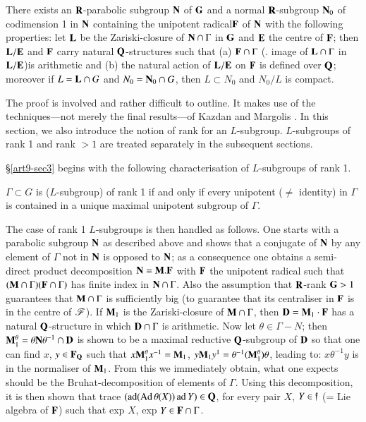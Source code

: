 There exists an $\mathbf{R}$-parabolic subgroup $\mathbf{N}$ of $\mathbf{G}$ and a normal $\mathbf{R}$-subgroup $\mathbf{N}_0$ of codimension  1 in $\mathbf{N}$ containing the unipotent radical\pageoriginale  $\mathbf{F}$ of $\mathbf{N}$ with the following properties: let $\mathbf{L}$ be the Zariski-closure of $\mathbf{N} \cap \Gamma$  in $\mathbf{G}$ and $\mathbf{E}$ the centre of $\mathbf{F}$; then $\mathbf{L}/\mathbf{E}$ and $\mathbf{F}$ carry natural $\mathbf{Q}$-structures such that (a) $\mathbf{F} \cap \Gamma$ (\resp. image of $\mathbf{L}\cap \Gamma$ in $\mathbf{L}/ \mathbf{E}$)is arithmetic and (b) the natural action of $\mathbf{L}/\mathbf{E}$ on $\mathbf{F}$ is defined over $\mathbf{Q}$; moreover if $L = \mathbf{L} \cap G$ and $N_0 = \mathbf{N}_0 \cap G$, then $L \subset N_0$ and $N_0/ L$ is compact.

The proof is involved and rather difficult to outline. It makes use of the techniques---not merely the final results---of Kazdan and Margolis \cite{art9-kazdan-margolis-1}. In this section, we also introduce the notion of rank for an $L$-subgroup. $L$-subgroups of rank 1 and rank $> 1$ are treated separately in the subsequent sections.

\S\ref{art9-sec3} begins with the following characterisation of $L$-subgroups of rank 1. 

$\Gamma \subset G$ is ($L$-subgroup) of rank 1 if and only if every unipotent ($\neq$ identity) in $\Gamma$ is contained in a unique maximal unipotent subgroup of $\Gamma$.

The case of rank 1 $L$-subgroups is then handled as follows. One starts with a parabolic subgroup $\mathbf{N}$ as described above and shows that a conjugate of $\mathbf{N}$ by any element of $\Gamma$ not in $\mathbf{N}$ is opposed to $\mathbf{N}$; as a consequence one obtains a semi-direct product decomposition $\mathbf{N} = \mathbf{M}. \mathbf{F}$ with $\mathbf{F}$ the unipotent radical such that $(\mathbf{M} \cap \Gamma) (\mathbf{F} \cap \Gamma)$  has finite index in $\mathbf{N} \cap \Gamma$. Also the assumption that $\mathbf{R}$-rank $\mathbf{G}>1$ guarantees that $\mathbf{M} \cap \Gamma$ is sufficiently big (to guarantee that its centraliser in $\mathbf{F}$ is in the centre of $\mathscr{F}$). If $\mathbf{M}_1$ is the Zariski-closure of $\mathbf{M} \cap \Gamma$, then $\mathbf{D} = \mathbf{M}_1 \cdot \mathbf{F}$ has a natural $\mathbf{Q}$-structure in which $\mathbf{D} \cap \Gamma$ is arithmetic. Now let $\theta \in \Gamma -N$; then $\mathbf{M}^\theta_1 = \theta \mathbf{N} \theta^{-1} \cap \mathbf{D}$ is shown to be a maximal reductive $\mathbf{Q}$-subgroup of $\mathbf{D}$ so that one can find $x$, $y \in \mathbf{F}_{\mathbf{Q}}$ such that $x \mathbf{M}^\theta_1 x^{-1} = \mathbf{M}_1$, $y \mathbf{M}_1 y^{1} = \theta^{-1} (\mathbf{M}^\theta_1) \theta$, leading to: $x\theta^{-1} y$ is in the normaliser of $\mathbf{M}_1$. From this we immediately obtain, what one expects should be the Bruhat-decomposition of elements of $\Gamma$. Using this decomposition, it is then shown that trace $(\operatorname{ad}(\operatorname{Ad} \theta (X)) \operatorname{ad} Y) \in \mathbf{Q}$, for every pair $X$, $Y \in \mathfrak{f}$ (= Lie algebra of $\mathbf{F}$) such that exp $X$, exp $Y \in \mathbf{F} \cap \Gamma$.


